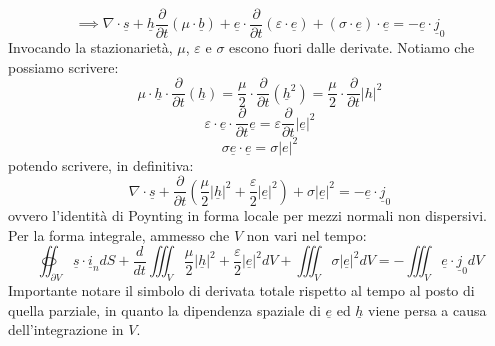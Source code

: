 \documentclass{book}
\begin{document}
        \begin{equation}
            \implies \nabla \cdot \underline{s} + \underline{h} \frac{\partial}{\partial t}(\mu \cdot \underline{b})+\underline{e} \cdot \frac{\partial}{\partial t}(\varepsilon \cdot \underline{e})+(\sigma \cdot \underline{e}) \cdot \underline{e} = -\underline{e} \cdot \underline{j}_{0}
        \end{equation}
        Invocando la stazionarietà, $\mu$, $\varepsilon$ e $\sigma$ escono fuori dalle derivate. Notiamo che possiamo scrivere:
        \begin{equation}
           \mu \cdot \underline{h} \cdot \frac{\partial}{\partial t} (\underline{h}) = \frac{\mu}{2} \cdot \frac{\partial}{\partial t} (\underline{h}^{2}) = \frac{\mu}{2} \cdot \frac{\partial}{\partial t}|h|^{2}
        \end{equation}
        \begin{equation}
            \varepsilon \cdot \underline{e} \cdot \frac{\partial}{\partial t} \underline{e} = \varepsilon \frac{\partial}{\partial t} |\underline{e}|^{2}
        \end{equation}
        \begin{equation}
            \sigma \underline{e} \cdot \underline{e} = \sigma |e|^{2}
        \end{equation}
        potendo scrivere, in definitiva:
        \begin{equation}
            \nabla \cdot \underline{s} + \frac{\partial}{\partial t}(\frac{\mu}{2} |\underline{h}|^{2}+\frac{\varepsilon}{2}|\underline{e}|^{2}) + \sigma |\underline{e}|^{2} = - \underline{e} \cdot \underline{j}_{0}
        \end{equation}
        ovvero l'identità di Poynting in forma locale per mezzi normali non dispersivi.
        Per la forma integrale, ammesso che $V$ non vari nel tempo:
        \begin{equation}
            \oiint_{\partial V} \underline{s} \cdot \underline{i}_{n} dS + \frac{d}{dt}\iiint_{V} \frac{\mu}{2} |\underline{h}|^{2}+\frac{\varepsilon}{2}|\underline{e}|^{2}dV + \iiint_{V} \sigma |\underline{e}|^{2} dV = - \iiint_{V} \underline{e}\cdot \underline{j}_{0}dV
        \end{equation}
        Importante notare il simbolo di derivata totale rispetto al tempo al posto di quella parziale, in quanto la dipendenza spaziale di $\underline{e}$ ed $\underline{h}$ viene persa a causa dell'integrazione in $V$. \\ \\
\end{document}
